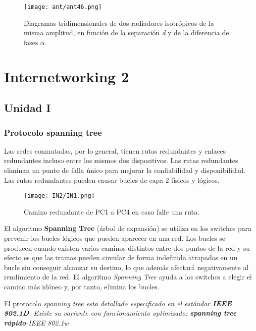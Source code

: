 \documentclass[
	12pt, %
	fleqn, %
	a4paper, %
	oneside, %
]{LegrandOrangeBook}
\begin{document}
\begin{figure}[H]
\centering
\texttt{[image: ant/ant46.png]}
\caption{Diagramas tridimensionales de dos radiadores isotrópicos de la misma amplitud, en función de
la separación \textit{d} y de la diferencia de fases $\alpha$.}
\end{figure}
\part{Internetworking 2}

\chapter{Unidad I}
\section{Protocolo spanning tree}
Las redes conmutadas, por lo general, tienen rutas  redundantes y enlaces redundantes incluso entre los  mismos dos dispositivos. Las rutas redundantes eliminan un punto de falla único  para mejorar la confiabilidad y disponibilidad. Las rutas redundantes pueden causar bucles de capa 2  físicos y lógicos.
\begin{figure}[H]
\centering
\texttt{[image: IN2/IN1.png]}
\caption{Camino redundante de PC1 a PC4 en caso falle una ruta.}
\end{figure}
El algoritmo \textbf{Spanning Tree} (árbol de expansión) se utiliza en los switches para prevenir los bucles lógicos que pueden aparecer en una red. Los bucles se producen cuando existen varios caminos distintos entre dos puntos de la red y su efecto es que las tramas pueden circular de forma indefinida atrapadas en un bucle sin conseguir alcanzar su destino, lo que además afectará negativamente al rendimiento de la red. El algoritmo \textit{Spanning Tree} ayuda a los switches a elegir el camino más idóneo y, por tanto, elimina los bucles.
\begin{notation}
El protocolo \textit{spanning tree esta detallado especificado en el estándar \textbf{IEEE 802.1D}. Existe su variante con funcionamiento optimizado: \textbf{spanning tree rápido}-IEEE 802.1w}
\end{notation}
\end{document}
